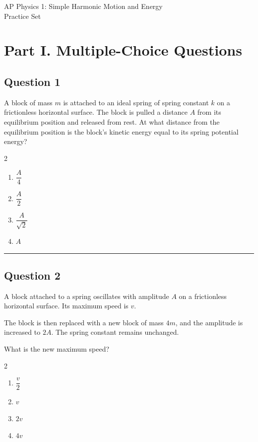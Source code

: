 \documentclass[12pt]{article}
\begin{document}
\begin{center}
{\LARGE AP Physics 1: Simple Harmonic Motion and Energy}\\
{\large Practice Set}\\
\end{center}

\section*{Part I. Multiple-Choice Questions}

\subsection*{Question 1}
A block of mass $m$ is attached to an ideal spring of spring constant $k$ on a frictionless horizontal surface. The block is pulled a distance $A$ from its equilibrium position and released from rest. At what distance from the equilibrium position is the block's kinetic energy equal to its spring potential energy?

\begin{multicols}{2}
\begin{enumerate}[label=\textbf{\Alph*.}]
\item $\dfrac{A}{4}$
\item $\dfrac{A}{2}$
\item $\dfrac{A}{\sqrt{2}}$
\item $A$
\end{enumerate}
\end{multicols}

\hrule

\subsection*{Question 2}
A block attached to a spring oscillates with amplitude $A$ on a frictionless horizontal surface. Its maximum speed is $v$.

The block is then replaced with a new block of mass $4m$, and the amplitude is increased to $2A$. The spring constant remains unchanged.

What is the new maximum speed?

\begin{multicols}{2}
\begin{enumerate}[label=\textbf{\Alph*.}]
\item $\dfrac{v}{2}$
\item $v$
\item $2v$
\item $4v$
\end{enumerate}
\end{multicols}
\end{document}
